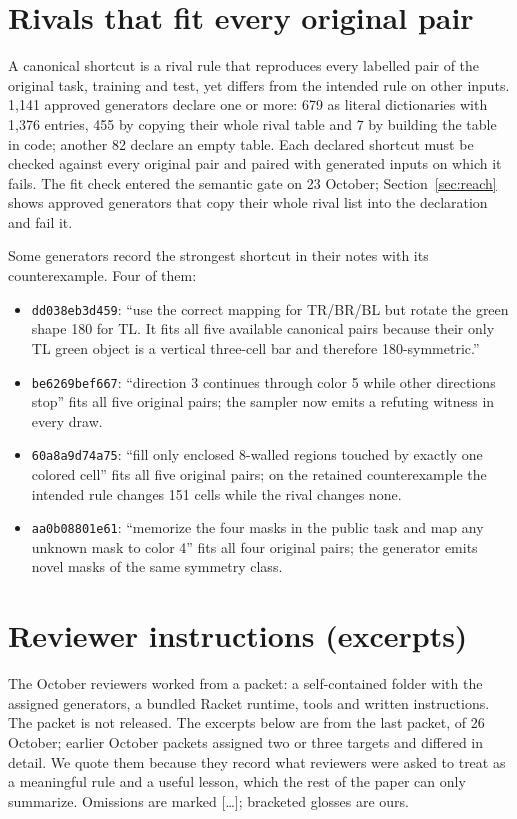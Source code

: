 \documentclass[11pt]{article}
\newcommand{\gen}[1]{\texttt{#1}}
\begin{document}
\section{Rivals that fit every original pair}
\label{app:rivals}

A canonical shortcut is a rival rule that reproduces every labelled pair of the
original task, training and test, yet differs from the intended rule on other
inputs. 1,141 approved generators declare one or more: 679 as literal
dictionaries with 1,376 entries, 455 by copying their whole rival table and 7 by
building the table in code; another 82 declare an empty table. Each declared shortcut must be checked against every
original pair and paired with generated inputs on which it fails. The fit check
entered the semantic gate on 23 October; Section~\ref{sec:reach} shows approved
generators that copy their whole rival list into the declaration and fail it.

Some generators record the strongest shortcut in their notes with its
counterexample. Four of them:
\begin{itemize}[nosep]
  \item \gen{dd038eb3d459}: ``use the correct mapping for TR/BR/BL but rotate the green shape 180\textdegree{} for TL. It fits all five available canonical pairs because their only TL green object is a vertical three-cell bar and therefore 180\textdegree-symmetric.''
  \item \gen{be6269bef667}: ``direction 3 continues through color 5 while other directions stop'' fits all five original pairs; the sampler now emits a refuting witness in every draw.
  \item \gen{60a8a9d74a75}: ``fill only enclosed 8-walled regions touched by exactly one colored cell'' fits all five original pairs; on the retained counterexample the intended rule changes 151 cells while the rival changes none.
  \item \gen{aa0b08801e61}: ``memorize the four masks in the public task and map any unknown mask to color 4'' fits all four original pairs; the generator emits novel masks of the same symmetry class.
\end{itemize}

\section{Reviewer instructions (excerpts)}
\label{app:packet}

The October reviewers worked from a packet: a self-contained folder with the
assigned generators, a bundled Racket runtime, tools and written instructions.
The packet is not released. The excerpts below are from the last packet, of
26 October; earlier October packets assigned two or three targets and differed
in detail. We quote them because they record what reviewers were asked to treat
as a meaningful rule and a useful lesson, which the rest of the paper can only
summarize. Omissions are marked [\dots]; bracketed glosses are ours.
\end{document}

